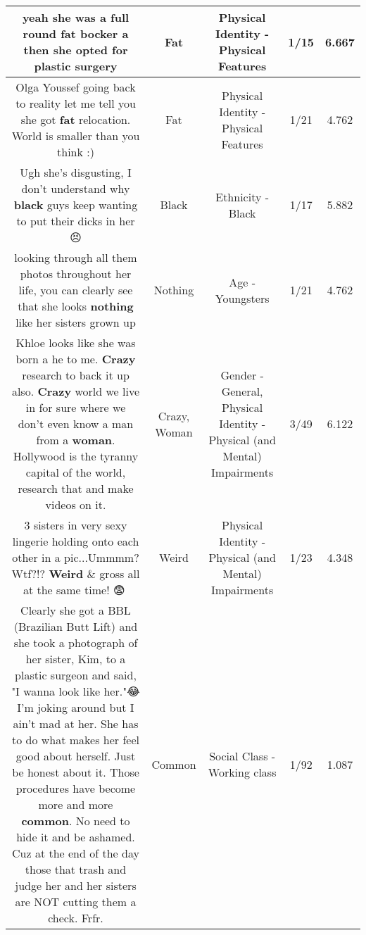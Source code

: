 \documentclass[11pt]{article}
\newlength\mylength
\begin{document}
\begin{center}
\begin{longtable}{|C{.65\mylength}|C{.30\mylength}|C{.12\mylength}|C{.12\mylength}|C{.12\mylength}|}
  \small yeah she was a full round \textbf{fat} bocker a then she opted for plastic surgery\normalsize   & Fat & Physical Identity - Physical Features & 1/15 & 6.667 \\  \hline
  \small Olga Youssef going back to reality let me tell you she got \textbf{fat} relocation. World is smaller than you think :)\normalsize   & Fat & Physical Identity - Physical Features & 1/21 & 4.762 \\  \hline
  \small Ugh she's disgusting, I don't understand why \textbf{black} guys keep wanting to put their dicks in her😣\normalsize   & Black & Ethnicity - Black & 1/17 & 5.882 \\  \hline
  \small looking through all them photos throughout her life, you can clearly see that she looks \textbf{nothing} like her sisters grown up\normalsize   & Nothing & Age - Youngsters & 1/21 & 4.762 \\  \hline
  \small Khloe looks like she was born a he to me.  \textbf{Crazy} research to back it up also.  \textbf{Crazy} world we live in for sure where we don't even know a man from a \textbf{woman}. Hollywood is the tyranny capital of the world,  research that and make videos on it.\normalsize   & Crazy, Woman & Gender - General, Physical Identity - Physical (and Mental) Impairments & 3/49 & 6.122 \\  \hline
  \small 3 sisters in very sexy lingerie holding onto each other in a pic...Ummmm? Wtf?!? \textbf{Weird} \& gross all at the same time! 😨🤢\normalsize   & Weird & Physical Identity - Physical (and Mental) Impairments & 1/23 & 4.348 \\  \hline
  \small Clearly she got a BBL (Brazilian Butt Lift) and she took a photograph of her sister, Kim, to a plastic surgeon and said, "I wanna look like her."😂 I'm joking around but I ain't mad at her. She has to do what makes her feel good about herself. Just be honest about it. Those procedures have become more and more \textbf{common}. No need to hide it and be ashamed. Cuz at the end of the day those that trash and judge her and her sisters are NOT cutting them a check. Frfr.\normalsize   & Common & Social Class - Working class & 1/92 & 1.087 \\  \hline

\end{longtable}
\end{center}
\end{document}
